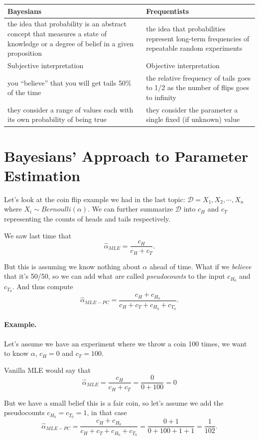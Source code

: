 \begin{tabular}{p{}p{}}
\hline
Bayesians & Frequentists\\
\hline\hline
the idea that probability is an abstract concept that measures a state of knowledge or a degree of belief in a given proposition &
the idea that probabilities represent long-term frequencies of repeatable random experiments\\
\hline
Subjective interpretation
& Objective interpretation\\
\hline
you ``believe'' that you will get tails 50\% of the time & 
the relative frequency of tails goes to 1/2 as the number of flips goes to infinity\\
they consider a range of values each with its own probability of being true& they consider the parameter a single fixed (if unknown) value\\
\end{tabular}

\section{Bayesians' Approach to Parameter Estimation}
Let's look at the coin flip example we had in the last topic: 
 $\mathcal{D} = X_1, X_2, \cdots, X_n$ 
where $X_i \sim Bernoulli(\alpha)$.
We can further summarize $\mathcal{D}$ into $c_H$ and $c_T$ 
representing the counts of heads and tails respectively. 

We saw last time that \[\hat\alpha_{MLE} = \frac{c_H}{c_H+c_T}.\]

But this is assuming we know nothing about $\alpha$ ahead of time. 
What if we \textit{believe} that it's 50/50, so we can add what are called \emph{pseudocounts}
to the input $c_{H_0}$ and $c_{T_0}$.
And thus compute 
\[\hat\alpha_{MLE-PC} = \frac{c_H+c_{H_0}}{c_H+c_T+c_{H_0}+c_{T_0}}.\]

\paragraph{Example. }
Let's assume we have an experiment where we throw a coin 100 times, we want to know $\alpha$, $c_H=0$ and $c_T=100$.

Vanilla MLE would say that 
\[\hat\alpha_{MLE} = \frac{c_H}{c_H+c_T} = \frac{0}{0 + 100} = 0\]
  
But we have a small belief this is a fair coin, so let's assume we add the pseudocounts $c_{H_0}=c_{T_0}=1$, 
in that case 
\[\hat\alpha_{MLE-PC} = \frac{c_H+c_{H_0}}{c_H+c_T+c_{H_0}+c_{T_0}}=\frac{0+1}{0+100+1+1} = \frac{1}{102}.\]


